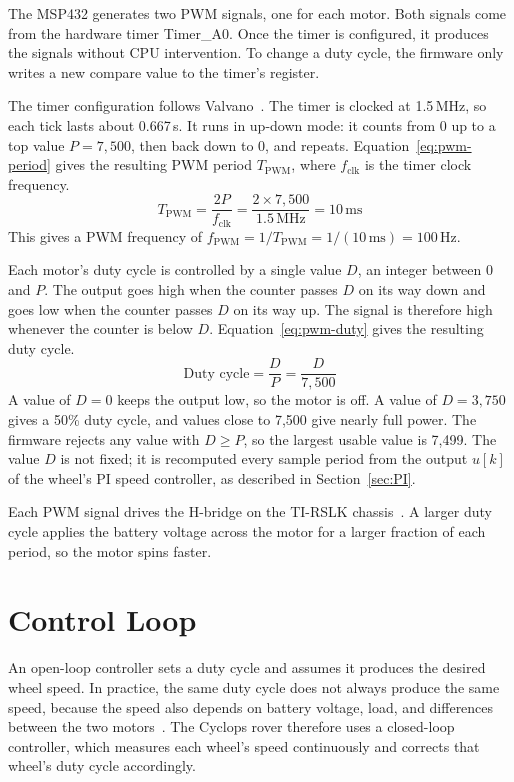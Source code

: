 The MSP432 generates two PWM signals, one for each motor. Both signals come from the
hardware timer Timer\_A0. Once the timer is configured, it produces the signals without
CPU intervention. To change a duty cycle, the firmware only writes a new compare value
to the timer's register.

The timer configuration follows Valvano~\cite{valvano}. 
The timer is clocked at 1.5\,MHz, so each tick lasts about 0.667\,\textmu s. It runs in
up-down mode: it counts from 0 up to a top value $P = 7{,}500$, then back down to 0,
and repeats.
Equation~\ref{eq:pwm-period} gives the resulting PWM period
$T_{\mathrm{PWM}}$, where $f_{\mathrm{clk}}$ is the timer clock frequency.
\begin{equation}
  T_{\mathrm{PWM}} = \frac{2P}{f_{\mathrm{clk}}}
  = \frac{2 \times 7{,}500}{1.5\,\text{MHz}} = 10\,\text{ms}
  \label{eq:pwm-period}
\end{equation}
This gives a PWM frequency of
$f_{\mathrm{PWM}} = 1/T_{\mathrm{PWM}} = 1/(10\,\text{ms}) = 100\,\text{Hz}$.

Each motor's duty cycle is controlled by a single value $D$, an integer between
0 and $P$. The output goes high when the counter passes $D$ on its way down and goes low
when the counter passes $D$ on its way up. The signal is therefore high whenever the
counter is below $D$. Equation~\ref{eq:pwm-duty} gives the resulting duty cycle.
\begin{equation}
  \text{Duty cycle} = \frac{D}{P} = \frac{D}{7{,}500}
  \label{eq:pwm-duty}
\end{equation}
A value of $D = 0$ keeps the output low, so the motor is off. A value of
$D = 3{,}750$ gives a 50\% duty cycle, and values close to 7{,}500 give nearly full
power. The firmware rejects any value with $D \geq P$, so the largest usable value is
7{,}499. The value $D$ is not fixed; it is recomputed every sample period from the
output $u[k]$ of the wheel's PI speed controller, as described in Section~\ref{sec:PI}.

Each PWM signal drives the H-bridge on the TI-RSLK chassis~\cite{valvano}. A larger duty
cycle applies the battery voltage across the motor for a larger fraction of each period,
so the motor spins faster.

\section{Control Loop}
\label{sec:control-loop}

An open-loop controller sets a duty cycle and assumes it produces the desired wheel
speed. In practice, the same duty cycle does not always produce the same speed, because
the speed also depends on battery voltage, load, and differences between the two
motors~\cite{valvano}. The Cyclops rover therefore uses a closed-loop controller, which
measures each wheel's speed continuously and corrects that wheel's duty cycle
accordingly.

